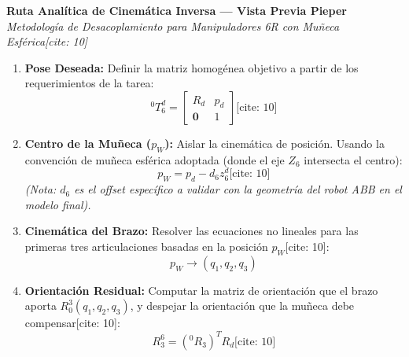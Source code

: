 \documentclass[11pt, a4paper]{article}
\begin{document}
\begin{center}
    \Large\textbf{\textcolor{ucbblue}{Ruta Analítica de Cinemática Inversa — Vista Previa Pieper}}\\[0.2cm]
    \normalsize \textit{Metodología de Desacoplamiento para Manipuladores 6R con Muñeca Esférica[cite: 10]}
\end{center}

\vspace{0.4cm}
\begin{tcolorbox}[colback=gray!5, colframe=ucbblue, title=\textbf{Flujo del Algoritmo Analítico}, fonttitle=\large\bfseries]
    \renewcommand{\arraystretch}{1.8}
    \begin{enumerate}
        \item \textbf{Pose Deseada:} Definir la matriz homogénea objetivo a partir de los requerimientos de la tarea:
        \begin{equation*}
            {}^0T_6^d = \begin{bmatrix} R_d & p_d \\ \mathbf{0} & 1 \end{bmatrix} \text{[cite: 10]}
        \end{equation*}
        
        \item \textbf{Centro de la Muñeca ($p_W$):} Aislar la cinemática de posición. Usando la convención de muñeca esférica adoptada (donde el eje $Z_6$ intersecta el centro):
        \begin{equation*}
            p_W = p_d - d_6 z_6^d \text{[cite: 10]}
        \end{equation*}
        \textit{(Nota: $d_6$ es el offset específico a validar con la geometría del robot ABB en el modelo final).}
        
        \item \textbf{Cinemática del Brazo:} Resolver las ecuaciones no lineales para las primeras tres articulaciones basadas en la posición $p_W$[cite: 10]:
        \begin{equation*}
            p_W \longrightarrow (q_1, q_2, q_3)
        \end{equation*}
        
        \item \textbf{Orientación Residual:} Computar la matriz de orientación que el brazo aporta $R_0^3(q_1, q_2, q_3)$, y despejar la orientación que la muñeca debe compensar[cite: 10]:
        \begin{equation*}
            R_3^6 = ({}^0R_3)^T R_d \text{[cite: 10]}
        \end{equation*}
        

\end{enumerate}
\end{tcolorbox}
\end{document}
